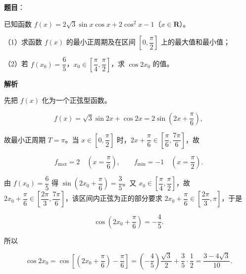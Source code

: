 \begin{answer}

\textbf{题目}：

已知函数 $f(x)=2\sqrt3\sin x\cos x+2\cos^2x-1$（$x\in\mathbf R$）。

（1）求函数 $f(x)$ 的最小正周期及在区间 $\left[0,\dfrac\pi2\right]$ 上的最大值和最小值；

（2）若 $f(x_0)=\dfrac65$，$x_0\in\left[\dfrac\pi4,\dfrac\pi2\right]$，求 $\cos2x_0$ 的值。

\textbf{解析}

先把 $f(x)$ 化为一个正弦型函数。

\nopagebreak[4]
\[f(x)=\sqrt3\sin2x+\cos2x=2\sin\left(2x+\frac\pi6\right),\]

故最小正周期 $T=\pi$。当 $x\in\left[0,\dfrac\pi2\right]$ 时，$2x+\dfrac\pi6\in\left[\dfrac\pi6,\dfrac{7\pi}6\right]$，故

\nopagebreak[4]
\[f_{\max}=2\quad\left(x=\frac\pi6\right),\qquad
f_{\min}=-1\quad\left(x=\frac\pi2\right).\]

由 $f(x_0)=\dfrac65$ 得 $\sin\left(2x_0+\dfrac\pi6\right)=\dfrac35$。又 $x_0\in\left[\dfrac\pi4,\dfrac\pi2\right]$，故 $2x_0+\dfrac\pi6\in\left[\dfrac{2\pi}3,\dfrac{7\pi}6\right]$，该区间内正弦为正的部分要求 $2x_0+\dfrac\pi6\in\left[\dfrac{2\pi}3,\pi\right]$，于是

\nopagebreak[4]
\[\cos\left(2x_0+\frac\pi6\right)=-\frac45.\]

所以

\nopagebreak[4]
\[\cos2x_0=\cos\left[\left(2x_0+\frac\pi6\right)-\frac\pi6\right]
=\left(-\frac45\right)\frac{\sqrt3}2+\frac35\cdot\frac12
=\frac{3-4\sqrt3}{10}.\]


\end{answer}
